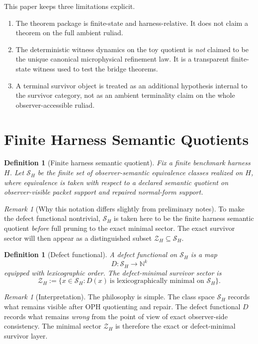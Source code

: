 \documentclass[11pt]{article}
\newtheorem{definition}[theorem]{Definition}
\theoremstyle{remark}
\newtheorem{remark}[theorem]{Remark}
\theoremstyle{plain}
\begin{document}
This paper keeps three limitations explicit.

\begin{enumerate}[leftmargin=2em]
\item The theorem package is finite-state and harness-relative. It does not claim a theorem on the full ambient ruliad.
\item The deterministic witness dynamics on the toy quotient is \emph{not} claimed to be the unique canonical microphysical refinement law. It is a transparent finite-state witness used to test the bridge theorems.
\item A terminal survivor object is treated as an additional hypothesis internal to the survivor category, not as an ambient terminality claim on the whole observer-accessible ruliad.
\end{enumerate}

\section{Finite Harness Semantic Quotients}
\label{sec:quotients}

\begin{definition}[Finite harness semantic quotient]
Fix a finite benchmark harness \(H\). Let \(\mathcal S_H\) be the finite set of observer-semantic equivalence classes realized on \(H\), where equivalence is taken with respect to a declared semantic quotient on observer-visible packet support and repaired normal-form support.
\end{definition}

\begin{remark}[Why this notation differs slightly from preliminary notes]
To make the defect functional nontrivial, \(\mathcal S_H\) is taken here to be the finite harness semantic quotient \emph{before} full pruning to the exact minimal sector. The exact survivor sector will then appear as a distinguished subset \(\mathcal Z_H\subseteq \mathcal S_H\).
\end{remark}

\begin{definition}[Defect functional]
A defect functional on \(\mathcal S_H\) is a map
\[
D:\mathcal S_H\to \mathbb N^k
\]
equipped with lexicographic order. The defect-minimal survivor sector is
\[
\mathcal Z_H:=\{x\in\mathcal S_H: D(x)\ \text{is lexicographically minimal on }\mathcal S_H\}.
\]
\end{definition}

\begin{remark}[Interpretation]
The philosophy is simple. The class space \(\mathcal S_H\) records what remains visible after OPH quotienting and repair. The defect functional \(D\) records what remains \emph{wrong} from the point of view of exact observer-side consistency. The minimal sector \(\mathcal Z_H\) is therefore the exact or defect-minimal survivor layer.
\end{remark}
\end{document}
